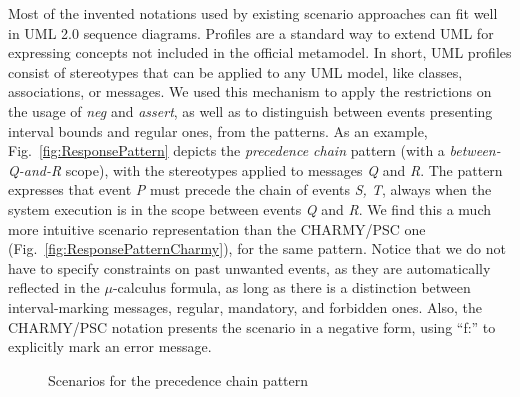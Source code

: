 \documentclass[letter]{llncs}
\begin{document}
Most of the invented notations used by existing scenario approaches can fit well in UML 2.0 sequence diagrams.
Profiles are a standard way to extend UML for expressing concepts not included in the official metamodel. 
In short, UML profiles consist of stereotypes that can be applied to any UML model, like classes,
associations, or messages. We used this mechanism 
to apply the restrictions on the usage of \emph{neg} and \emph{assert},
as well as to distinguish between events presenting interval bounds and regular ones, from the patterns.
As an example, Fig.~\ref{fig:ResponsePattern} depicts the \emph{precedence chain} pattern (with
a \emph{between-Q-and-R} scope), with the stereotypes applied to messages
\emph{Q} and \emph{R}.
The pattern expresses that event \emph{P} must precede the chain of events
\emph{S, T}, always when the system execution is in the scope between events
\emph{Q} and \emph{R}.
We find this a much more intuitive scenario representation than the CHARMY/PSC
one (Fig.~\ref{fig:ResponsePatternCharmy}), for the same pattern.
Notice that we do not have to specify constraints on past unwanted events, as they are automatically
reflected in the $\mu$-calculus formula, as long as there is a distinction between interval-marking messages,
regular, mandatory, and forbidden ones. Also, the CHARMY/PSC notation presents the scenario in a negative form, using ``f:'' to
explicitly mark an error message. 
\begin{figure}[t!]
  \centering
  \hfill
  \caption{Scenarios for the precedence chain pattern}
\end{figure}
\end{document}
